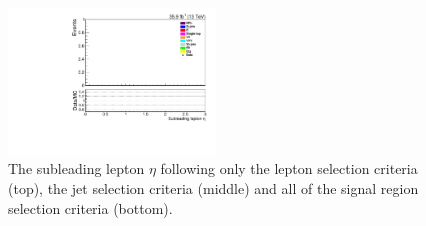 \begin{figure}[ht]
\includegraphics[width=0.49\textwidth]{figs/background-estimation/plots/unblinded/prompt_mumu_ttbarInc/lep2Eta_NPL_mumu_wMass_mumu.pdf}
\caption{
The subleading lepton $\eta$ following only the lepton selection criteria (top), the jet selection criteria (middle) and all of the signal region selection criteria (bottom).
}
\label{fig:SR_lep2Eta}
\end{figure}

